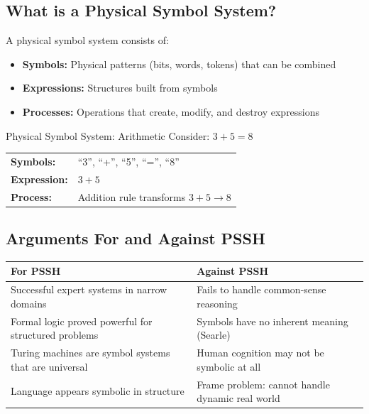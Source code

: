 \documentclass[12pt,a4paper]{report}
\begin{document}
\subsection{What is a Physical Symbol System?}

A physical symbol system consists of:
\begin{itemize}[noitemsep]
  \item \textbf{Symbols:} Physical patterns (bits, words, tokens) that can be combined
  \item \textbf{Expressions:} Structures built from symbols
  \item \textbf{Processes:} Operations that create, modify, and destroy expressions
\end{itemize}

\begin{examplebox}{Physical Symbol System: Arithmetic}
Consider: $3 + 5 = 8$

\begin{tabular}{ll}
\textbf{Symbols:} & ``3'', ``+'', ``5'', ``='', ``8'' \\
\textbf{Expression:} & $3 + 5$ \\
\textbf{Process:} & Addition rule transforms $3 + 5 \rightarrow 8$ \\
\end{tabular}
\end{examplebox}

\subsection{Arguments For and Against PSSH}

\begin{center}
\begin{tabular}{p{}p{}}
\toprule
\textbf{\textcolor{accent}{For PSSH}} & \textbf{\textcolor{danger}{Against PSSH}} \\
\midrule
Successful expert systems in narrow domains & Fails to handle common-sense reasoning \\
Formal logic proved powerful for structured problems & Symbols have no inherent meaning (Searle) \\
Turing machines are symbol systems that are universal & Human cognition may not be symbolic at all \\
Language appears symbolic in structure & Frame problem: cannot handle dynamic real world \\
\bottomrule
\end{tabular}
\end{center}
\end{document}
